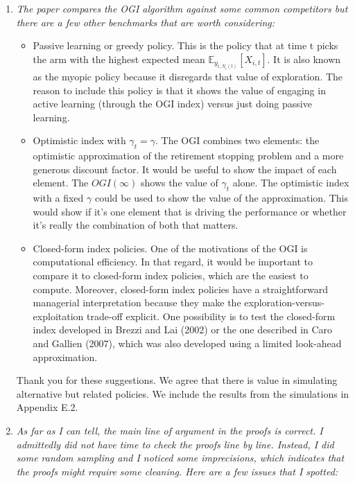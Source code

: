 \documentclass[11pt]{article}
\newcommand{\1}{\ensuremath{\mathbf{1}}} %
\theoremstyle{thm-sf}
\begin{document}
\begin{enumerate}
		\item {\it The paper compares the OGI algorithm against some common competitors but there are a few other benchmarks that are worth considering:
		\begin{itemize}
			\item Passive learning or greedy policy. This is the policy that at time t picks the arm with the highest expected mean $\mathbb E_{y_{i, N_i(t)}}[X_{i,t}]$. It is also known as the myopic policy because it disregards that value of exploration. The reason to include this policy is that it shows the value of engaging in active learning (through the OGI index) versus just doing passive learning.
			
			\item Optimistic index with $\gamma_t = \gamma$. The OGI combines two elements: the optimistic approximation of the retirement stopping problem and a more generous discount factor. It would be useful to show the impact of each element. The $OGI(\infty)$ shows the value of $\gamma_t$ alone. The optimistic index with a fixed $\gamma$ could be used to show the value of the approximation. This would show if it's one element that is driving the performance or whether it's really the combination of both that matters.
			
			\item Closed-form index policies. One of the motivations of the OGI is computational efficiency. In that regard, it would be important to compare it to closed-form index policies, which are the easiest to compute. Moreover, closed-form index policies have a straightforward managerial interpretation because they make the exploration-versus- exploitation trade-off explicit. One possibility is to test the closed-form index developed in Brezzi and Lai (2002) or the one described in Caro and Gallien (2007), which was also developed using a limited look-ahead approximation.
	\end{itemize}}
	
	Thank you for these suggestions. We agree that there is value in simulating alternative but related policies. We include the results from the simulations in Appendix E.2.

	\item {\it As far as I can tell, the main line of argument in the proofs is correct. I admittedly did not have time to check the proofs line by line. Instead, I did some random sampling and I noticed some imprecisions, which indicates that the proofs might require some cleaning. Here are a few issues that I spotted:}
		

\end{enumerate}
\end{document}
